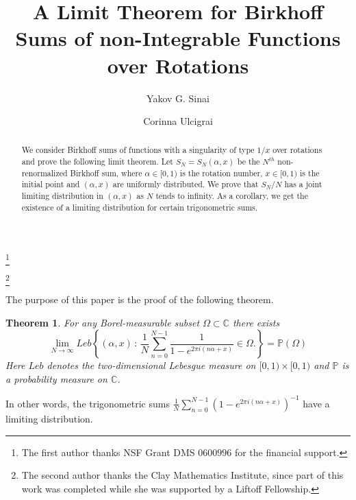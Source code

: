 \documentclass{conm-p-l}
\numberwithin{equation}{section}
\newtheorem{thm}{Theorem}
\begin{document}
\title[A Limit Theorem for Birkhoff sums over
Rotations]{A Limit Theorem for Birkhoff Sums  of  non-Integrable Functions   over
Rotations}

\author{Yakov G. Sinai}
\address{Mathematics Department \\ Princeton University \\ Princeton \\ New Jersey 08544 \\ USA \endgraf
 Landau Institute for Theoretical Physics \\  Moscow \\ Russia}
\thanks{The first author thanks NSF Grant DMS $0600996$ for the financial support.}

\author{Corinna Ulcigrai}
\address{School of Mathematics \\ University of Bristol \\ Bristol BS8 1TW \\ United Kingdom}
\thanks{The second author thanks the  Clay Mathematics Institute, since part of this work was completed while she was supported by a Liftoff Fellowship.}




\begin{abstract}
We consider Birkhoff sums of functions with a singularity of type $1/x$ over rotations and prove the following limit theorem. Let $S_N= S_N( \alpha,x)$ be the $N^{th}$ non-renormalized Birkhoff sum, where $\alpha\in [0,1)$ is the rotation number, $x\in [0,1)$ is the initial point and $(\alpha, x)$ are uniformly distributed.  
 We prove that  $S_N/N$ has a joint limiting distribution in $( \alpha,x)$ as $N$ tends to infinity. 
As a corollary, we get the existence of a limiting distribution for certain trigonometric sums. 
\end{abstract}

\maketitle

The purpose of this paper is the proof of the following theorem.
\begin{thm}\label{limitingexponentialsums}
For any Borel-measurable subset $\Omega \subset \mathbb{C}$ there exists
\begin{equation}\label{complexdistr}
\lim_{N\rightarrow \infty} Leb \left\{ (\alpha, x ) {\, : \, }
\frac{1}{N}\sum_{n=0}^{N-1}  \frac{1}{1- e^{2\pi i (n\alpha + x)} } \in \Omega .
\right\} = \mathbb{P}(\Omega)
\end{equation}
Here $Leb$
denotes  the two-dimensional Lebesgue measure on
 $[0,1)\times[0,1) $ 
 and $\mathbb{P}$ is a probability measure on $\mathbb{C}$.
\end{thm}
In other words, the trigonometric sums $\frac{1}{N}\sum_{n=0}^{N-1} ({1- e^{2\pi i (n\alpha + x)} })^{-1}$ have a limiting distribution. 
\end{document}
